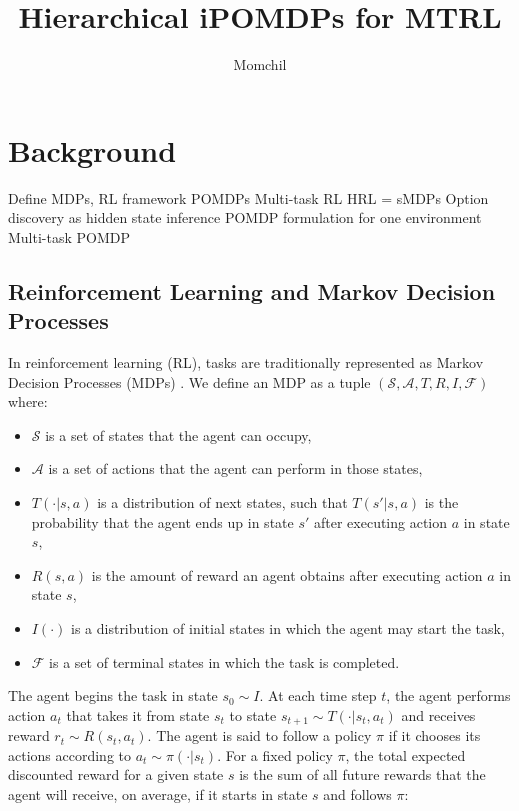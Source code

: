 \documentclass[11pt]{article}
\title{Hierarchical iPOMDPs for MTRL}
\author{Momchil}
\begin{document}
\maketitle






\section{Background} 

Define MDPs, RL framework
POMDPs
Multi-task RL
HRL = sMDPs
Option discovery as hidden state inference
POMDP formulation for one environment
Multi-task POMDP

\subsection{Reinforcement Learning and Markov Decision Processes}

In reinforcement learning (RL), tasks are traditionally represented as Markov Decision Processes (MDPs) \cite{Sutton1998}. We define an MDP as a tuple $(\mathcal{S}, \mathcal{A}, T, R, I, \mathcal{F})$ where:
\begin{itemize}
\item $\mathcal{S}$ is a set of states that the agent can occupy,
\item $\mathcal{A}$ is a set of actions that the agent can perform in those states,
\item $T(\cdot|s,a)$ is a distribution of next states, such that $T(s'|s,a)$ is the probability that the agent ends up in state $s'$ after executing action $a$ in state $s$,
\item $R(s,a)$ is the amount of reward an agent obtains after executing action $a$ in state $s$,
\item $I(\cdot)$ is a distribution of initial states in which the agent may start the task,
\item $\mathcal{F}$ is a set of terminal states in which the task is completed.
\end{itemize}

The agent begins the task in state $s_0 \sim I$. At each time step $t$, the agent performs action $a_t$ that takes it from state $s_t$ to state $s_{t+1} \sim T(\cdot|s_t,a_t)$ and receives reward $r_t \sim R(s_t, a_t)$. The agent is said to follow a policy $\pi$ if it chooses its actions according to $a_t \sim \pi(\cdot|s_t)$. For a fixed policy $\pi$, the total expected discounted reward for a given state $s$ is the sum of all future rewards that the agent will receive, on average, if it starts in state $s$ and follows $\pi$:
\end{document}
